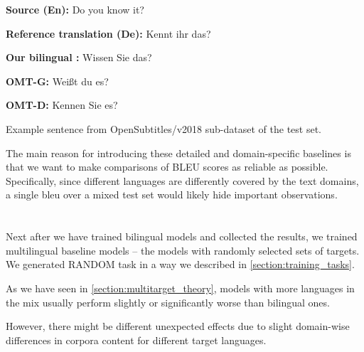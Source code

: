 \vspace{\baselineskip}
\begin{minipage}[t]{0.9\textwidth}

\textbf{Source (En):}  Do you know it? 

\textbf{Reference translation (De):} Kennt ihr das?

\textbf{Our bilingual :} Wissen Sie das?

\textbf{OMT-G:} Weißt du es?

\textbf{OMT-D:} Kennen Sie es?

	\begin{exmp}
	Example sentence from OpenSubtitles/v2018 sub-dataset of 
	the  test set.

	\label{exmp:biling_de_opensubtitles}
	\end{exmp}
\end{minipage}
\vspace{\baselineskip}

The main reason for introducing these detailed and domain-specific
baselines is that we want to make comparisons of BLEU scores as
reliable as possible.
Specifically, since different languages are differently covered by
the text domains, a single \acrshort{bleu} over a mixed test set would likely
hide important observations.

\section{}
\label{section:multilingual_baseline}

Next after we have trained bilingual models and collected the results,
we trained multilingual baseline models -- the models with randomly
selected sets of targets.
We generated RANDOM task in a way we described in \cref{section:training_tasks}.

As we have seen in \cref{section:multitarget_theory}, models with more languages
in the mix usually perform slightly or significantly worse than bilingual ones.

However, there might be different unexpected effects due to slight domain-wise differences
in corpora content for different target languages.

